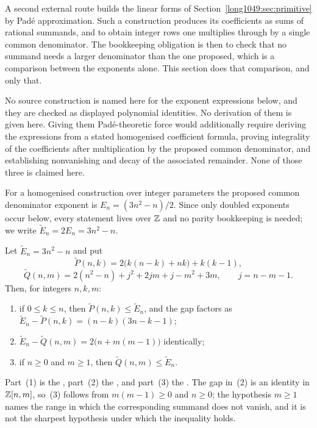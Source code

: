 \documentclass[11pt]{article}
\begin{document}
A second external route builds the linear forms of Section~\ref{long1049:sec:primitive}
by Pad\'e approximation.  Such a construction produces its coefficients as sums
of rational summands, and to obtain integer rows one multiplies through by a
single common denominator.  The bookkeeping obligation is then to check that no
summand needs a larger denominator than the one proposed, which is a comparison
between the exponents alone.  This section does that comparison, and only that.

No source construction is named here for the exponent expressions below, and
they are checked as displayed polynomial identities.  No derivation of them is
given here.
Giving them Pad\'e-theoretic force would additionally require deriving the
expressions from a stated homogenised coefficient formula, proving integrality
of the coefficients after multiplication by the proposed common denominator,
and establishing nonvanishing and decay of the associated remainder.  None of
those three is claimed here.

For a
homogenised construction over integer parameters the proposed common
denominator exponent is $E_n=(3n^{2}-n)/2$.  Since only doubled exponents
occur below, every statement lives over $\mathbb{Z}$ and no parity bookkeeping is
needed; we write $\widetilde{E}_n=2E_n=3n^{2}-n$.

\begin{proposition}\label{long1049:res:pade}
Let $\widetilde{E}_n=3n^{2}-n$ and put
\[
 \widetilde{P}(n,k)=2\bigl(k(n-k)+nk\bigr)+k(k-1),
\]
\[
 \widetilde{Q}(n,m)=2(n^{2}-n)+j^{2}+2jm+j-m^{2}+3m,
 \qquad j=n-m-1 .
\]
Then, for integers $n,k,m$:
\begin{enumerate}
\item if $0\le k\le n$, then $\widetilde{P}(n,k)\le\widetilde{E}_n$, and the
gap factors as
$\widetilde{E}_n-\widetilde{P}(n,k)=(n-k)(3n-k-1)$;
\item $\widetilde{E}_n-\widetilde{Q}(n,m)=2\bigl(n+m(m-1)\bigr)$ identically;
\item if $n\ge0$ and $m\ge1$, then $\widetilde{Q}(n,m)\le\widetilde{E}_n$.
\end{enumerate}
\end{proposition}

\noindent Part~(1) is the
, part~(2) the
, and part~(3) the
.  The gap in~(2) is an identity in $\mathbb{Z}[n,m]$, so~(3) follows
from $m(m-1)\ge0$ and $n\ge0$; the hypothesis $m\ge1$ names the range in which
the corresponding summand does not vanish, and it is not the sharpest
hypothesis under which the inequality holds.
\end{document}
